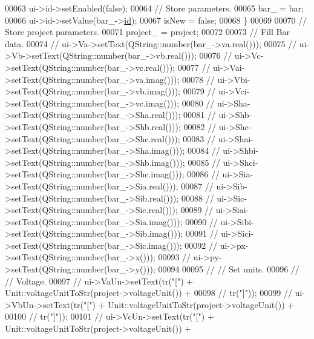 \begin{DoxyCode}
00063     ui->id->setEnabled(\textcolor{keyword}{false});
00064     \textcolor{comment}{// Store parameters.}
00065     bar\_ = bar;
00066     ui->id->setValue(bar\_->\hyperlink{class_bar_a9dc5c6a6d44fe412ae34ef8a881b8dce}{id});
00067     isNew = \textcolor{keyword}{false};
00068   \}
00069 
00070   \textcolor{comment}{// Store project parameters.}
00071   project\_ = project;
00072 
00073   \textcolor{comment}{// Fill Bar data.}
00074 \textcolor{comment}{//  ui->Va->setText(QString::number(bar\_->va.real()));}
00075 \textcolor{comment}{//  ui->Vb->setText(QString::number(bar\_->vb.real()));}
00076 \textcolor{comment}{//  ui->Vc->setText(QString::number(bar\_->vc.real()));}
00077 \textcolor{comment}{//  ui->Vai->setText(QString::number(bar\_->va.imag()));}
00078 \textcolor{comment}{//  ui->Vbi->setText(QString::number(bar\_->vb.imag()));}
00079 \textcolor{comment}{//  ui->Vci->setText(QString::number(bar\_->vc.imag()));}
00080 \textcolor{comment}{//  ui->Sha->setText(QString::number(bar\_->Sha.real()));}
00081 \textcolor{comment}{//  ui->Shb->setText(QString::number(bar\_->Shb.real()));}
00082 \textcolor{comment}{//  ui->Shc->setText(QString::number(bar\_->Shc.real()));}
00083 \textcolor{comment}{//  ui->Shai->setText(QString::number(bar\_->Sha.imag()));}
00084 \textcolor{comment}{//  ui->Shbi->setText(QString::number(bar\_->Shb.imag()));}
00085 \textcolor{comment}{//  ui->Shci->setText(QString::number(bar\_->Shc.imag()));}
00086 \textcolor{comment}{//  ui->Sia->setText(QString::number(bar\_->Sia.real()));}
00087 \textcolor{comment}{//  ui->Sib->setText(QString::number(bar\_->Sib.real()));}
00088 \textcolor{comment}{//  ui->Sic->setText(QString::number(bar\_->Sic.real()));}
00089 \textcolor{comment}{//  ui->Siai->setText(QString::number(bar\_->Sia.imag()));}
00090 \textcolor{comment}{//  ui->Sibi->setText(QString::number(bar\_->Sib.imag()));}
00091 \textcolor{comment}{//  ui->Sici->setText(QString::number(bar\_->Sic.imag()));}
00092 \textcolor{comment}{//  ui->px->setText(QString::number(bar\_->x()));}
00093 \textcolor{comment}{//  ui->py->setText(QString::number(bar\_->y()));}
00094 
00095 \textcolor{comment}{//  // Set units.}
00096 \textcolor{comment}{//  // Voltage.}
00097 \textcolor{comment}{//  ui->VaUn->setText(tr("[") + Unit::voltageUnitToStr(project->voltageUnit()) +}
00098 \textcolor{comment}{//                    tr("]"));}
00099 \textcolor{comment}{//  ui->VbUn->setText(tr("[") + Unit::voltageUnitToStr(project->voltageUnit()) +}
00100 \textcolor{comment}{//                    tr("]"));}
00101 \textcolor{comment}{//  ui->VcUn->setText(tr("[") + Unit::voltageUnitToStr(project->voltageUnit()) +}

\end{DoxyCode}
